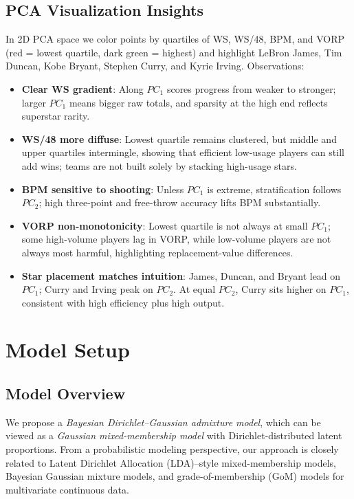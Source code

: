 \documentclass[12pt]{article}
\begin{document}
\subsection{PCA Visualization Insights}
In 2D PCA space we color points by quartiles of WS, WS/48, BPM, and VORP (red = lowest quartile, dark green = highest) and highlight LeBron James, Tim Duncan, Kobe Bryant, Stephen Curry, and Kyrie Irving. Observations:
\begin{itemize}[leftmargin=*]
    \item \textbf{Clear WS gradient}: Along $PC_1$ scores progress from weaker to stronger; larger $PC_1$ means bigger raw totals, and sparsity at the high end reflects superstar rarity.
    \item \textbf{WS/48 more diffuse}: Lowest quartile remains clustered, but middle and upper quartiles intermingle, showing that efficient low-usage players can still add wins; teams are not built solely by stacking high-usage stars.
    \item \textbf{BPM sensitive to shooting}: Unless $PC_1$ is extreme, stratification follows $PC_2$; high three-point and free-throw accuracy lifts BPM substantially.
    \item \textbf{VORP non-monotonicity}: Lowest quartile is not always at small $PC_1$; some high-volume players lag in VORP, while low-volume players are not always most harmful, highlighting replacement-value differences.
    \item \textbf{Star placement matches intuition}: James, Duncan, and Bryant lead on $PC_1$; Curry and Irving peak on $PC_2$. At equal $PC_2$, Curry sits higher on $PC_1$, consistent with high efficiency plus high output.
\end{itemize}

\section{Model Setup}
\subsection{Model Overview}

We propose a \emph{Bayesian Dirichlet--Gaussian admixture model}, which can be viewed as a
\emph{Gaussian mixed-membership model} with Dirichlet-distributed latent proportions.
From a probabilistic modeling perspective, our approach is closely related to
Latent Dirichlet Allocation (LDA)--style mixed-membership models, Bayesian Gaussian mixture
models, and grade-of-membership (GoM) models for multivariate continuous data.
\end{document}
